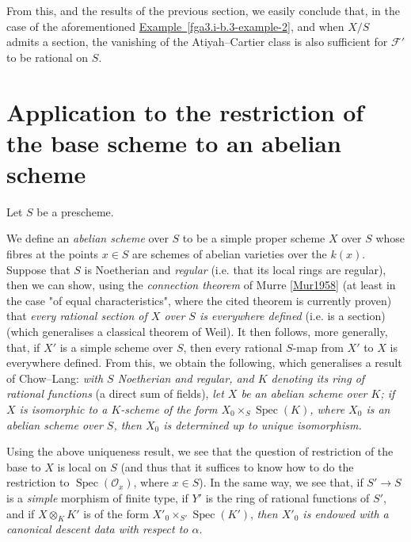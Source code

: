   From this, and the results of the previous section, we easily conclude that, in the case of the aforementioned \hyperref[fga3.i-b.3-example-2]{Example~\ref*{fga3.i-b.3-example-2}}, and when \(X/S\) admits a section, the vanishing of the Atiyah–Cartier class is also sufficient for \(\mathcal {F}'\) to be rational on \(S\).\section{Application to the restriction of the base scheme to an abelian scheme}\label{fga3.i-b.5}\par{}Let \(S\) be a prescheme.
  
  We define an \emph{abelian scheme} over \(S\) to be a simple proper scheme \(X\) over \(S\) whose fibres at the points \(x\in  S\) are schemes of abelian varieties over the \(k(x)\).
  Suppose that \(S\) is Noetherian and \emph{regular} (i.e. that its local rings are regular), then we can show, using the \emph{connection theorem} of Murre \hyperref[Mur1958]{[Mur1958]} (at least in the case "of equal characteristics", where the cited theorem is currently proven) that \emph{every rational section of \(X\) over \(S\) is everywhere defined} (i.e. is a section) (which generalises a classical theorem of Weil).
  It then follows, more generally, that, if \(X'\) is a simple scheme over \(S\), then every rational \(S\)-map from \(X'\) to \(X\) is everywhere defined.
  From this, we obtain the following, which generalises a result of Chow–Lang:
  \emph{with \(S\) Noetherian and regular, and \(K\) denoting its ring of rational functions} (a direct sum of fields), \emph{let \(X\) be an abelian scheme over \(K\); if \(X\) is isomorphic to a \(K\)-scheme of the form \(X_0\times _S\operatorname {Spec}(K)\), where \(X_0\) is an abelian scheme over \(S\), then \(X_0\) is determined up to unique isomorphism.}\par{}Using the above uniqueness result, we see that the question of restriction of the base to \(X\) is local on \(S\) (and thus that it suffices to know how to do the restriction to \(\operatorname {Spec}(\mathscr {O}_x)\), where \(x\in  S\)).
  In the same way, we see that, if \(S'\to  S\) is a \emph{simple} morphism of finite type, if \(Y'\) is the ring of rational functions of \(S'\), and if \(X\otimes _K K'\) is of the form \(X'_0\times _{S'}\operatorname {Spec}(K')\), \emph{then \(X'_0\) is endowed with a canonical descent data with respect to \(\alpha \)}.
